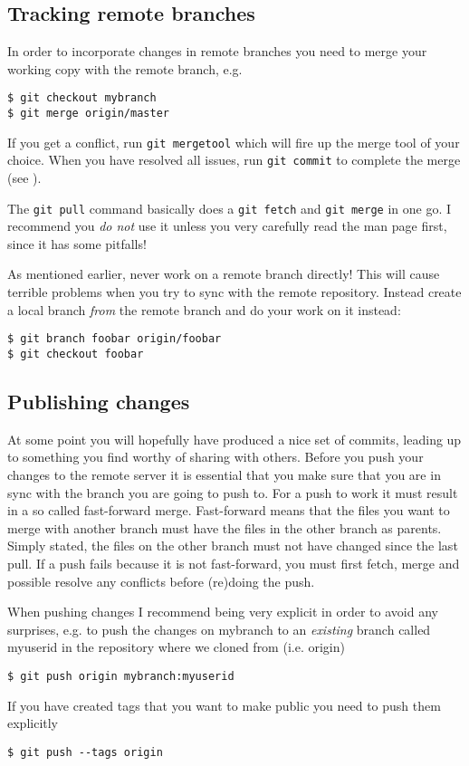 \documentclass[a4paper,10pt]{article}
\begin{document}
\subsection{Tracking remote branches}
In order to incorporate changes in remote branches you need to merge your
working copy with the remote branch, e.g. 
\begin{verbatim}
$ git checkout mybranch
$ git merge origin/master 
\end{verbatim}
If you get a conflict, run
\texttt{git mergetool} which will fire up the merge tool of your choice. When
you have resolved all issues, run \texttt{git commit} to complete the merge 
(see ).

The \texttt{git pull} command basically does a \texttt{git fetch} and
\texttt{git merge} in one go. I recommend you \emph{do not} use it unless you
very carefully read the man page first, since it has some pitfalls!

As mentioned earlier, never work on a remote branch directly! This will
cause terrible problems when you try to sync with the remote repository.
Instead create a local branch \emph{from} the remote branch and do your work
on it instead: 
\begin{verbatim}
$ git branch foobar origin/foobar
$ git checkout foobar 
\end{verbatim}

\subsection{Publishing changes}
At some point you will hopefully have produced a nice set of commits, leading
up to something you find worthy of sharing with others. Before you
push your changes to the remote server it is essential that you make sure that 
you are in sync with the branch you are going to push to. For a push to work
it must result in a so called fast-forward merge.
Fast-forward means that the files you want to merge with another branch must
have the files in the other branch as parents.  Simply stated, the files on
the other branch must not have changed since the last pull. If a push fails
because it is not fast-forward, you must first fetch, merge and possible
resolve any conflicts before (re)doing the push.

When pushing changes I recommend being very explicit in order to avoid any
surprises, e.g. to push the changes on mybranch to an \emph{existing} branch
called myuserid in the repository where we cloned from (i.e. origin) 
\begin{verbatim}
$ git push origin mybranch:myuserid
\end{verbatim}
If you have created tags that you want to make public you need to push them
explicitly
\begin{verbatim}
$ git push --tags origin 
\end{verbatim}
\end{document}
